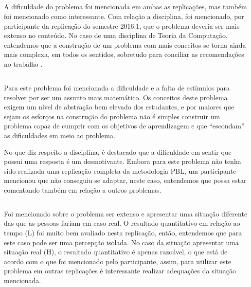 \subsection{\ProblemaE}

A dificuldade do problema foi mencionada em ambas as replicações, mas
também foi mencionado como interessante.
Com relação a disciplina, foi mencionado, por participante da
replicação do semestre 2016.1, que o problema deveria ser
mais extenso no conteúdo.
No caso de uma disciplina de Teoria da Computação, entendemos
que a construção de um problema com mais conceitos se
torna ainda mais complexa, em todos os sentidos, sobretudo
para conciliar as recomendações
no trabalho \cite{dolmans1997seven}.

\subsection{\ProblemaF}

Para este problema foi mencionada a dificuldade e a falta de estímulos
para resolver por ser um assunto mais matemático.
Os conceitos deste problema exigem um nível de abstração bem elevado
dos estudantes, e por maiores que sejam os esforços na construção
do problema não é simples construir um problema capaz de cumprir com
os objetivos de aprendizagem e que ``escondam'' as dificuldades
em meio ao problema.

No que diz respeito a disciplina, é destacado que a dificuldade
em sentir que possui uma resposta é um desmotivante.
Embora para este problema não tenha sido realizada uma replicação
completa da metodologia PBL, um participante mencionou que não
conseguiu se adaptar, neste caso, entendemos que possa estar
comentando também em relação a outros problemas.

\subsection{\ProblemaG}

Foi mencionado sobre o problema ser extenso e
apresentar uma situação diferente das que as pessoas fariam em caso
real.
O resultado quantitativo em relação ao tempo (L)
foi muito bem avaliado nesta replicação, então, entendemos que
para este caso pode ser uma percepção isolada.
No caso da situação apresentar uma situação real (H), o resultado
quantitativo é apenas razoável, o que está de acordo
com o que foi mencionado pelo participante, assim, para utilizar
este problema em outras replicações é interessante realizar adequações
da situação mencionada.

